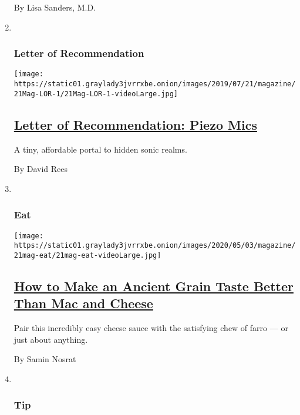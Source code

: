 \begin{enumerate}
  By Lisa Sanders, M.D.
\item ~
  \hypertarget{letter-of-recommendation}{%
  \subsubsection{Letter of
  Recommendation}\label{letter-of-recommendation}}

  \texttt{[image: https://static01.graylady3jvrrxbe.onion/images/2019/07/21/magazine/21Mag-LOR-1/21Mag-LOR-1-videoLarge.jpg]}

  \hypertarget{letter-of-recommendation-piezo-mics}{%
  \subsection{\texorpdfstring{\href{/2019/07/16/magazine/letter-of-recommendation-piezo-mics.html}{Letter
  of Recommendation: Piezo
  Mics}}{Letter of Recommendation: Piezo Mics}}\label{letter-of-recommendation-piezo-mics}}

  A tiny, affordable portal to hidden sonic realms.

  By David Rees
\item ~
  \hypertarget{eat}{%
  \subsubsection{Eat}\label{eat}}

  \texttt{[image: https://static01.graylady3jvrrxbe.onion/images/2020/05/03/magazine/21mag-eat/21mag-eat-videoLarge.jpg]}

  \hypertarget{how-to-make-an-ancient-grain-taste-better-than-mac-and-cheese}{%
  \subsection{\texorpdfstring{\href{/2019/07/17/magazine/melted-cheese-sauce-farro-recipe.html}{How
  to Make an Ancient Grain Taste Better Than Mac and
  Cheese}}{How to Make an Ancient Grain Taste Better Than Mac and Cheese}}\label{how-to-make-an-ancient-grain-taste-better-than-mac-and-cheese}}

  Pair this incredibly easy cheese sauce with the satisfying chew of
  farro --- or just about anything.

  By Samin Nosrat
\item ~
  \hypertarget{tip}{%
  \subsubsection{Tip}\label{tip}}


\end{enumerate}

